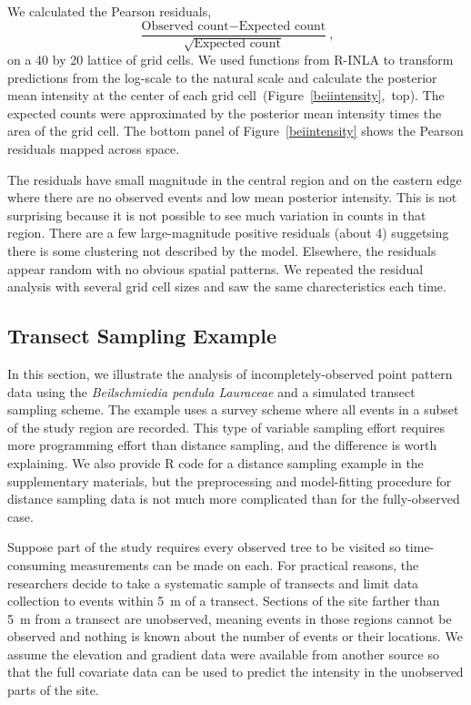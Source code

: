 \documentclass[]{interact}
\begin{document}
We calculated the Pearson residuals,
\begin{displaymath}
\frac{\text{Observed count} - \text{Expected count}}
{\sqrt{\text{Expected count}}},
\end{displaymath}
on a 40 by 20 lattice of grid cells. We used functions from R-INLA to transform
predictions from the log-scale to the natural scale and calculate the posterior
mean intensity at the center of each grid
cell~(Figure~\ref{beiintensity},~top). The expected counts were approximated by the posterior mean intensity times the area of the grid cell. The bottom panel
of Figure~\ref{beiintensity} shows the Pearson residuals mapped across space.

The residuals have small magnitude in the central region and on the eastern
edge where there are no observed events and low mean posterior intensity. This
is not surprising because it is not possible to see much variation in counts
in that region. There are a few large-magnitude positive residuals (about 4)
suggetsing there is some clustering not described by the model. Elsewhere, the
residuals appear random with no obvious spatial patterns. We repeated the
residual analysis with several grid cell sizes and saw the same charecteristics
each time.


\subsection{Transect Sampling Example}
\label{xsectanalysis}

In this section, we illustrate the analysis of incompletely-observed point
pattern data using the \emph{Beilschmiedia pendula Lauraceae} and a simulated
transect sampling scheme. The example uses a survey scheme where all events in
a subset of the study region are recorded. This type of variable sampling
effort requires more programming effort than distance sampling, and the
difference is worth explaining. We also provide R code for a distance sampling
example in the supplementary materials, but the preprocessing and model-fitting
procedure for distance sampling data is not much more complicated than for the
fully-observed case.

Suppose part of the study requires every observed tree to be visited so
time-consuming measurements can be made on each. For practical reasons, the
researchers decide to take a systematic sample of transects and limit data
collection to events within 5~m of a transect. Sections of the site farther
than 5~m from a transect are unobserved, meaning events in those regions
cannot be observed and nothing is known about the number of events or their
locations. We assume the elevation and gradient data were available from
another source so that the full covariate data can be used to predict the
intensity in the unobserved parts of the site.
\end{document}
